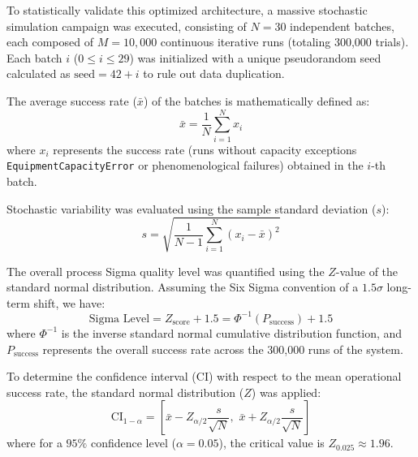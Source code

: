 \documentclass[10pt,letterpaper,twocolumn]{article}
\begin{document}
To statistically validate this optimized architecture, a massive stochastic simulation campaign was executed, consisting of $N = 30$ independent batches, each composed of $M = 10,000$ continuous iterative runs (totaling 300,000 trials). Each batch $i$ ($0 \le i \le 29$) was initialized with a unique pseudorandom seed calculated as $\text{seed} = 42 + i$ to rule out data duplication. 

The average success rate ($\bar{x}$) of the batches is mathematically defined as:
\begin{equation}
\bar{x} = \frac{1}{N} \sum_{i=1}^{N} x_i
\end{equation}
where $x_i$ represents the success rate (runs without capacity exceptions \texttt{EquipmentCapacityError} or phenomenological failures) obtained in the $i$-th batch.

Stochastic variability was evaluated using the sample standard deviation ($s$):
\begin{equation}
s = \sqrt{\frac{1}{N-1} \sum_{i=1}^{N} (x_i - \bar{x})^2}
\end{equation}

The overall process Sigma quality level was quantified using the $Z$-value of the standard normal distribution. Assuming the Six Sigma convention of a $1.5\sigma$ long-term shift, we have:
\begin{equation}
\text{Sigma Level} = Z_{\text{score}} + 1.5 = \Phi^{-1}(P_{\text{success}}) + 1.5
\end{equation}
where $\Phi^{-1}$ is the inverse standard normal cumulative distribution function, and $P_{\text{success}}$ represents the overall success rate across the 300,000 runs of the system.

To determine the confidence interval (CI) with respect to the mean operational success rate, the standard normal distribution ($Z$) was applied:
\begin{equation}
\text{CI}_{1-\alpha} = \left[ \bar{x} - Z_{\alpha/2} \frac{s}{\sqrt{N}}, \,\, \bar{x} + Z_{\alpha/2} \frac{s}{\sqrt{N}} \right]
\end{equation}
where for a $95\%$ confidence level ($\alpha = 0.05$), the critical value is $Z_{0.025} \approx 1.96$.
\end{document}
